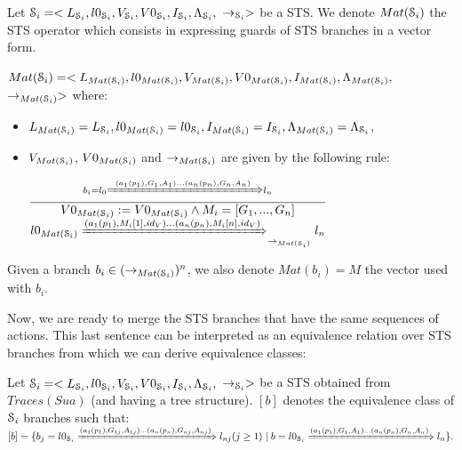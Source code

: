 \begin{definition}
	\label{rule:matrix}

  Let $\EuScript{S}_i=<L_{\EuScript{S}_i},l0_{\EuScript{S}_i},V_{\EuScript{S}_i},V0_{\EuScript{S}_i},I_{\EuScript{S}_i},\Lambda_{\EuScript{S}_i},$
  $\rightarrow_{\EuScript{S}_i}>$ be a STS. We denote
  $Mat(\EuScript{S}_i)$ the STS operator which consists in
  expressing guards of STS branches in a vector form.

  $Mat(\EuScript{S}_i)=<L_{Mat(\EuScript{S}_i)},l0_{Mat(\EuScript{S}_i)},V_{Mat(\EuScript{S}_i)},V0_{Mat(\EuScript{S}_i)},I_{Mat(\EuScript{S}_i)},\Lambda_{Mat(\EuScript{S}_i)},$
  $\rightarrow_{Mat(\EuScript{S}_i)}>$ where:

	\begin{itemize}
    \item $L_{Mat(\EuScript{S}_i)}=L_{\EuScript{S}_i}, l0_{Mat(\EuScript{S}_i)}=l0_{\EuScript{S}_i}, I_{Mat(\EuScript{S}_i)}=I_{\EuScript{S}_i},\Lambda_{Mat(\EuScript{S}_i)} = \Lambda_{\EuScript{S}_i}$,

    \item $V_{Mat(\EuScript{S}_i)}$, $V0_{Mat(\EuScript{S}_i)}$
      and $\rightarrow_{Mat(\EuScript{S}_i)}$ are given by the
      following rule:

    $\frac{b_i=l_0 \xRightarrow{(a_1(p_1),G_1,A_1)...(a_n(p_n),G_n,A_n)} l_n}{
      \begin{matrix}
        V0_{Mat(\EuScript{S}_i)}:=V0_{Mat(\EuScript{S}_i)} \wedge M_{i}=[G_1,...,G_n]\\
        l0_{Mat(\EuScript{S}_i)} \xRightarrow{(a_1(p_1),M_i[1],id_V) ...(a_n(p_n),M_i[n],id_V) }_{\rightarrow_{Mat(\EuScript{S}_i)}} l_n\\
      \end{matrix}
    }$
  \end{itemize}

  Given a branch $b_i \in (\rightarrow_{Mat(\EuScript{S}_i)})^n$, we also denote
  $Mat(b_i)=M$ the vector used with $b_i$.
\end{definition}

Now, we are ready to merge the STS branches that have the same
sequences of actions. This last sentence can be interpreted as an
equivalence relation over STS branches from which we can derive
equivalence classes:

\begin{definition}
Let
$\EuScript{S}_i=<L_{\EuScript{S}_i},l0_{\EuScript{S}_i},V_{\EuScript{S}_i},V0_{\EuScript{S}_i},I_{\EuScript{S}_i},\Lambda_{\EuScript{S}_i},$
$\rightarrow_{\EuScript{S}_i}>$ be a STS obtained from
$Traces(Sua)$ (and having a tree structure). $[b]$ denotes the
equivalence class of $\EuScript{S}_i$ branches such that: $[b]=\{
b_j= l0_{\EuScript{S}_i}\\
\xRightarrow{(a_1(p_1),G_{1j},A_{1j})\dots(a_n(p_n),G_{nj},A_{nj})}
l_{nj}(j\geq 1) \mid b=l0_{\EuScript{S}_i}
\xRightarrow{(a_1(p_1),G_{1},A_{1})\dots(a_n(p_n),G_{n},A_{n})}
l_n\}.$
\end{definition}

